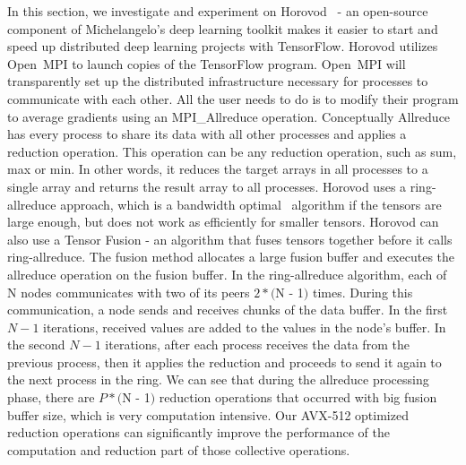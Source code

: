 \documentclass[5p,times,twocolumn]{elsarticle}
\newcommand{\ompi}[0]{Open~MPI\xspace}
\begin{document}
In this section, we investigate and experiment on Horovod~\cite{sergeev2018horovod} - an
open-source component of Michelangelo's deep learning toolkit makes it easier to start and
speed up distributed deep learning projects with TensorFlow.
%
Horovod utilizes \ompi to launch copies of the TensorFlow program. \ompi will transparently set up the distributed infrastructure necessary for processes to communicate with each other. All the user needs to do is to
modify their program to average gradients using an MPI\_Allreduce operation.
%
Conceptually Allreduce has every process to share its data with all other processes and applies a reduction operation.
This operation can be any reduction operation, such as sum, max or min.
In other words, it reduces the target arrays in all processes
to a single array and returns the result array to all processes.
%
Horovod uses a ring-allreduce approach, which is a bandwidth optimal~\cite{allreduce-optimal} algorithm if the tensors are large enough, but does not
work as efficiently for smaller tensors.
Horovod can also use a Tensor Fusion - an algorithm that fuses tensors together
before it calls ring-allreduce. The fusion method allocates a large fusion buffer and executes the
allreduce operation on the fusion buffer.
%
In the ring-allreduce algorithm, each of N nodes communicates with two of its
peers $2 * ($N - 1$)$ times. During this communication, a node sends and receives chunks of the data
buffer. In the first $N - 1$ iterations, received values are added to the values in the node's buffer. In
the second $N - 1$ iterations, after each process receives the data from the previous process, then it
applies the reduction and proceeds to send it again to the next process in the ring.
%
We can see that during the allreduce processing phase, there are $P * ($N - 1$)$ reduction operations
that occurred with big fusion buffer size, which is very computation intensive.
Our AVX-512 optimized reduction operations can significantly improve the performance
of the computation and reduction part of those collective operations.
\end{document}
